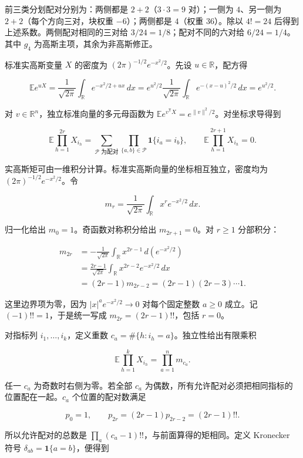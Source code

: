 \documentclass[11pt,a4paper]{article}
\begin{document}
前三类分划配对分别为：两侧都是 \(2+2\)（\(3\cdot3=9\) 对）；一侧为 \(4\)、另一侧为 \(2+2\)（每个方向三对，块权重 \(-6\)）；两侧都是 \(4\)（权重 \(36\)）。除以 \(4!=24\) 后得到上述系数。两侧配对相同的三对给 \(3/24=1/8\)；配对不同的六对给 \(6/24=1/4\)。其中 \(g_4\) 为高斯主项，其余为非高斯修正。

标准实高斯变量 \(X\) 的密度为 \((2\pi)^{-1/2}e^{-x^2/2}\)。先设 \(u\in\mathbb R\)，配方得

\[\mathbb Ee^{uX}=\frac1{\sqrt{2\pi}}\int_{\mathbb R}e^{-x^2/2+ux}\,dx
=e^{u^2/2}\frac1{\sqrt{2\pi}}\int_{\mathbb R}e^{-(x-u)^2/2}\,dx=e^{u^2/2}.\]

对 \(v\in\mathbb R^n\)，独立标准向量的多元母函数为 \(\mathbb Ee^{v^{\mathsf T}X}=e^{\|v\|^2/2}\)。对坐标求导得到

\[\mathbb E\prod_{h=1}^{2r}X_{i_h}
=\sum_{\mathcal P\text{ 为配对}}\prod_{\{a,b\}\in\mathcal P}\mathbf1\{i_a=i_b\},
\qquad \mathbb E\prod_{h=1}^{2r+1}X_{i_h}=0.\]

实高斯矩可由一维积分计算。标准实高斯向量的坐标相互独立，密度均为 \((2\pi)^{-1/2}e^{-x^2/2}\)。令

\[m_r=\frac1{\sqrt{2\pi}}\int_{\mathbb R}x^re^{-x^2/2}\,dx.\]

归一化给出 \(m_0=1\)。奇函数对称积分给出 \(m_{2r+1}=0\)。对 \(r\ge1\) 分部积分：

\[\begin{aligned}
m_{2r}
&=-\frac1{\sqrt{2\pi}}\int_{\mathbb R}x^{2r-1}\,d(e^{-x^2/2})\\
&=\frac{2r-1}{\sqrt{2\pi}}\int_{\mathbb R}x^{2r-2}e^{-x^2/2}\,dx\\
&=(2r-1)m_{2r-2}
=(2r-1)(2r-3)\cdots1.
\end{aligned}\]

这里边界项为零，因为 \(|x|^ae^{-x^2/2}\to0\) 对每个固定整数 \(a\ge0\) 成立。记 \((-1)!!=1\)，于是统一写成 \(m_{2r}=(2r-1)!!\)，包括 \(r=0\)。

对指标列 \(i_1,\ldots,i_k\)，定义重数 \(c_a=\#\{h:i_h=a\}\)。独立性给出有限乘积

\[\mathbb E\prod_{h=1}^kX_{i_h}=\prod_{a=1}^n m_{c_a}.\]

任一 \(c_a\) 为奇数时右侧为零。若全部 \(c_a\) 为偶数，所有允许配对必须把相同指标的位置配在一起。\(c_a\) 个位置的配对数满足

\[p_0=1,\qquad p_{2r}=(2r-1)p_{2r-2}
=(2r-1)!!.\]

所以允许配对的总数是 \(\prod_a(c_a-1)!!\)，与前面算得的矩相同。定义 Kronecker 符号 \(\delta_{ab}=\mathbf1\{a=b\}\)，便得到
\end{document}
